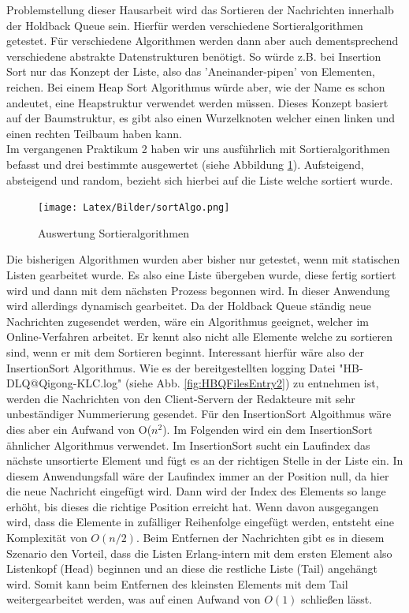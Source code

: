 Problemstellung dieser Hausarbeit wird das Sortieren der Nachrichten innerhalb der Holdback Queue sein. Hierfür werden verschiedene Sortieralgorithmen getestet. Für verschiedene Algorithmen werden dann aber auch dementsprechend verschiedene abstrakte Datenstrukturen benötigt. So würde z.B. bei Insertion Sort nur das Konzept der Liste, also das 'Aneinander-pipen' von Elementen, reichen. Bei einem Heap Sort Algorithmus würde aber, wie der Name es schon andeutet, eine Heapstruktur verwendet werden müssen. Dieses Konzept basiert auf der Baumstruktur, es gibt also einen Wurzelknoten welcher einen linken und einen rechten Teilbaum haben kann.\\
Im vergangenen Praktikum 2 haben wir uns ausführlich mit Sortieralgorithmen befasst und drei bestimmte ausgewertet (siehe Abbildung \ref{fig:sortAlgo}). Aufsteigend, absteigend und random, bezieht sich hierbei auf die Liste welche sortiert wurde.

\begin{figure}[htbp]
\begin{center}
\texttt{[image: Latex/Bilder/sortAlgo.png]}
\caption{\label{fig:sortAlgo} Auswertung Sortieralgorithmen \cite{sortAlgo}} 
\end{center}
\end{figure}

Die bisherigen Algorithmen wurden aber bisher nur getestet, wenn mit statischen Listen gearbeitet wurde. Es also eine Liste übergeben wurde, diese fertig sortiert wird und dann mit dem nächsten Prozess begonnen wird. In dieser Anwendung wird allerdings dynamisch gearbeitet. Da der Holdback Queue ständig neue Nachrichten zugesendet werden, wäre ein Algorithmus geeignet, welcher im Online-Verfahren arbeitet. Er kennt also nicht alle Elemente welche zu sortieren sind, wenn er mit dem Sortieren beginnt. Interessant hierfür wäre also der InsertionSort Algorithmus. 
Wie es der bereitgestellten logging Datei "HB-DLQ@Qigong-KLC.log" (siehe Abb. \ref{fig:HBQFilesEntry2}) zu entnehmen ist, werden die Nachrichten von den Client-Servern der Redakteure mit sehr unbeständiger Nummerierung gesendet. Für den InsertionSort Algoithmus wäre dies aber ein Aufwand von O($n^2$). Im Folgenden wird ein dem InsertionSort ähnlicher Algorithmus verwendet. Im InsertionSort sucht ein Laufindex das nächste unsortierte Element und fügt es an der richtigen Stelle in der Liste ein. In diesem Anwendungsfall wäre der Laufindex immer an der Position null, da hier die neue Nachricht eingefügt wird. Dann wird der Index des Elements so lange erhöht, bis dieses die richtige Position erreicht hat. Wenn davon ausgegangen wird, dass die Elemente in zufälliger Reihenfolge eingefügt werden, entsteht eine Komplexität von $O(n/2)$. Beim Entfernen der Nachrichten gibt es in diesem Szenario den Vorteil, dass die Listen Erlang-intern mit dem ersten Element also Listenkopf (Head) beginnen und an diese die restliche Liste (Tail) angehängt wird. Somit kann beim Entfernen des kleinsten Elements mit dem Tail weitergearbeitet werden, was auf einen Aufwand von $O(1)$ schließen lässt.

